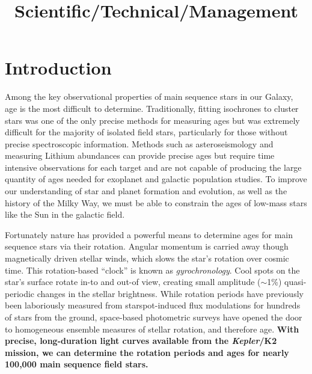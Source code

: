 \documentclass[12pt]{article}
\newcommand{\Kepler}{\textsl{Kepler}\xspace}
\begin{document}


\title{\vspace{-0.5in}Scientific/Technical/Management}
\date{}

\maketitle


\vspace{-1in}

\section{Introduction}



Among the key observational properties of main sequence stars in our Galaxy,
age is the most difficult to determine.
Traditionally, fitting isochrones to cluster stars was one of the only precise
methods for measuring ages but was extremely difficult for the majority of
isolated field stars, particularly for those without precise spectroscopic
information.
Methods such as asteroseismology and measuring Lithium abundances can provide
precise ages but require time intensive observations for each target and are
not capable of producing the large quantity of ages needed for exoplanet and
galactic population studies.
To improve our understanding of star and planet formation and evolution, as
well as the history of the Milky Way, we must be able to constrain the ages of
low-mass stars like the Sun in the galactic field.

Fortunately nature has provided a powerful means to determine ages for main
sequence stars via their rotation.
Angular momentum is carried away though magnetically driven stellar winds,
which slows the star's rotation over cosmic time.
This rotation-based ``clock'' is known as {\it gyrochronology}.
Cool spots on the star's surface rotate in-to and out-of view, creating small
amplitude ($\sim$1\%) quasi-periodic changes in the stellar brightness.
While rotation periods have previously been laboriously measured from
starspot-induced flux modulations for hundreds of stars from the ground,
space-based photometric surveys have opened the door to homogeneous ensemble
measures of stellar rotation, and therefore age.
{\bf With precise, long-duration light curves available from the \Kepler/K2
mission, we can determine the rotation periods and ages for nearly 100,000
main sequence field stars.}
\end{document}
